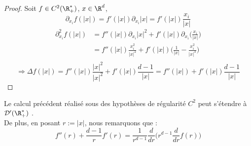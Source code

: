 \begin{proof}




    Soit $f \in C^2(\R_+^*)$, $x \in \R^d$,\\
    $$\partial_{x_i} f(|x|) = f'(|x|)\partial_{x_i}|x| = f'(|x|)\frac{x_i}{|x|}$$
    \begin{align*}
        \partial_{x_i}^2 f(|x|) &= f''(|x|) \partial_{x_i}|x|^2 + f'(|x|) \partial_{x_i}\bigg(\frac{x_i}{|x|}\bigg)  \\
        &= f''(|x|)\frac{x_i^2}{|x|^2} + f'(|x|)\bigg( \frac{1}{|x|} - \frac{x_i^2}{|x|^3} \bigg) \\
    \end{align*}
    $$\Rightarrow \Delta f(|x|) = f''(|x|)\frac{|x|^2}{|x|^2} + f'(|x|) \frac{d-1}{|x|} = f''(|x|) + f'(|x|)\frac{d-1}{|x|} $$

\end{proof}
\begin{remarkbox}
    \begin{remark}
        Le calcul précédent réalisé sous des hypothèses de régularité $C^2$ peut s'étendre à $\mathcal{D}'(\R_+^*)$ \cite{Golse}.\\
        De plus, en posant $r := |x|$, nous remarquons que : 
        $$ f''(r) + \frac{d-1}{r}f'(r) = \frac{1}{r^{d-1}}\frac{d}{dr}\bigg(r^{d-1} \frac{d}{dr} f(r) \bigg) $$
    \end{remark}
\end{remarkbox}
